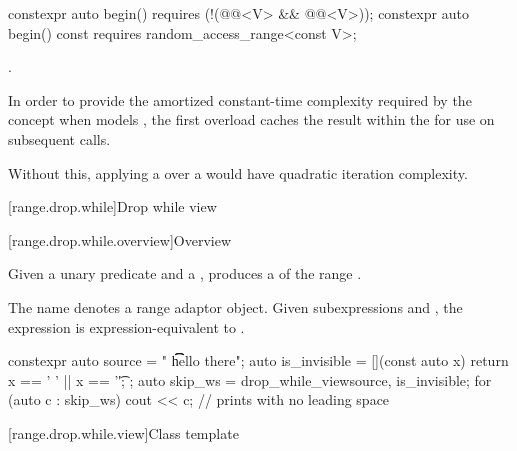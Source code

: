 %
\begin{itemdecl}
constexpr auto begin()
  requires (!(@@<V> && @@<V>));
constexpr auto begin() const
  requires random_access_range<const V>;
\end{itemdecl}

\begin{itemdescr}
\pnum
\returns
{}.

\pnum
\remarks
In order to provide the amortized constant-time complexity required
by the  concept
when  models ,
the first overload caches the result within the 
for use on subsequent calls.
\begin{note}
Without this,
applying a  over a 
would have quadratic iteration complexity.
\end{note}
\end{itemdescr}

[range.drop.while]{Drop while view}

[range.drop.while.overview]{Overview}

\pnum
Given a unary predicate  and a  ,
 produces a 
of the range .

\pnum
The name 
denotes a range adaptor object.
Given subexpressions  and ,
the expression 
is expression-equivalent to .

\pnum
\begin{example}
\begin{codeblock}
constexpr auto source = "  \t   \t   \t   hello there";
auto is_invisible = [](const auto x) { return x == ' ' || x == '\t'; };
auto skip_ws = drop_while_view{source, is_invisible};
for (auto c : skip_ws) {
  cout << c;                                    // prints  with no leading space
}
\end{codeblock}
\end{example}

[range.drop.while.view]{Class template }

